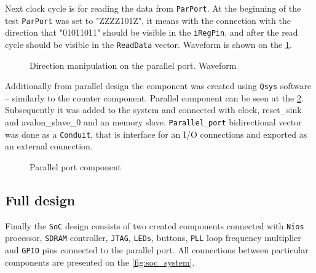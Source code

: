 Next clock cycle is for reading the data from \verb|ParPort|. At the beginning of the test \verb|ParPort| was set to "ZZZZ101Z", it means with the connection with the direction that "01011011" should be visible in the \verb|iRegPin|, and after the read cycle should be visible in the \verb|ReadData| vector.
Waveform is shown on the 
\figurename{} \ref{fig:parallel_data_read}.
\begin{figure}[H]
	\begin{center}
	\end{center}
	\caption{Direction manipulation on the parallel port. Waveform}
	\label{fig:parallel_data_read}
\end{figure}

Additionally from parallel design the component was created using \verb|Qsys| software -- similarly to the counter component. Parallel component can be seen at the \figurename{} \ref{fig:parallel_port_component}. Subsequently it was added to the system and connected with clock, reset\_sink and avalon\_slave\_0 and an memory slave. \verb|Parallel_port| bidirectional vector was done as a \verb|Conduit|, that is interface for an I/O connections and exported as an external connection. 

\begin{figure}[H]
	\begin{center}
	\end{center}
	\caption{Parallel port component}
	\label{fig:parallel_port_component}
\end{figure}

\subsection{Full design}
Finally the \verb|SoC| design consists of two created components connected with \verb|Nios| processor, \verb|SDRAM| controller, \verb|JTAG|, \verb|LEDs|, buttons, \verb|PLL| loop frequency multiplier and \verb|GPIO| pins connected to the parallel port. All connections between particular components are presented on the \figurename{} \ref{fig:soc_system}.

